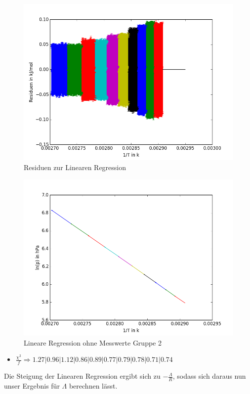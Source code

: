 \documentclass[12pt,a4paper]{article}
\begin{document}
\begin{figure}[H]
\centering
\includegraphics[scale=1]{Bilder/residuen_EL_neuerFehler.png}
\caption{Residuen zur Linearen Regression}
\end{figure}
\begin{figure}[H]
\centering
\includegraphics[scale=0.7]{Bilder/linreg_nurlinreg_EL.png}
\caption{Lineare Regression ohne Messwerte Gruppe 2}
\end{figure}
\begin{itemize}
\item $\frac{\chi^2}{f} \Rightarrow 1.27 | 0.96 | 1.12 | 0.86 | 0.89 | 0.77 | 0.79 | 0.78 | 0.71 | 0.74$
\end{itemize}
Die Steigung der Linearen Regression ergibt sich zu $-\frac{\Lambda}{R}$, sodass sich daraus nun unser Ergebnis für $\Lambda$ berechnen lässt.
\end{document}
